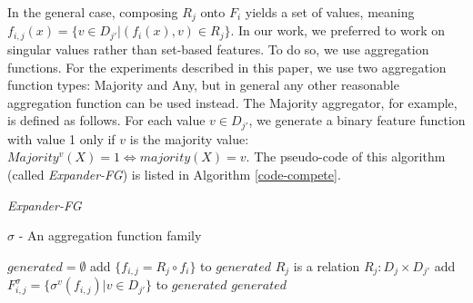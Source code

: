 \documentclass[letterpaper]{article} %
\theoremstyle{definition}
\begin{document}
In the general case, composing $R_j$ onto $F_i$ yields a set of values, meaning $f_{i,j}(x)=\{v\in D_{j'}|(f_i(x),v)\in R_j\}$. 
In our work, we preferred to work on singular values rather than set-based features. To do so, we use aggregation functions.
For the experiments described in this paper, we use  
two aggregation function types: Majority and Any, but in general any other reasonable aggregation function can be used instead.
The Majority aggregator, for example, is defined as follows.  For each value $v\in D_{j'}$, we generate a binary feature function with value 1 only if $v$ is the majority value: 
$Majority^v(X)=1 \iff majority(X)=v$.
The pseudo-code of this algorithm (called   
\emph{Expander-FG}) is listed in Algorithm \ref{code-compete}.


\begin{algorithm}[H]
	\caption{\emph{Expander-FG}}
	\label{code-compete}
	\small
	$\sigma$ - An aggregation function family
	\begin{algorithmic}
		\State $generated=\emptyset$
		\State add $\{f_{i,j}=R_j\circ f_i\}$ to $generated$
		\Else \Comment $R_j$ is a relation $R_j:D_j\times D_{j'}$
		\State add $F^\sigma_{i,j}=\{\sigma^v(f_{i,j})|v\in D_{j'}\}$ to $generated$
		\EndIf
		\EndFor
		\EndFor
		\State \Return $generated$ 
		\EndFunction
		
	\end{algorithmic}
\end{algorithm}
\end{document}
